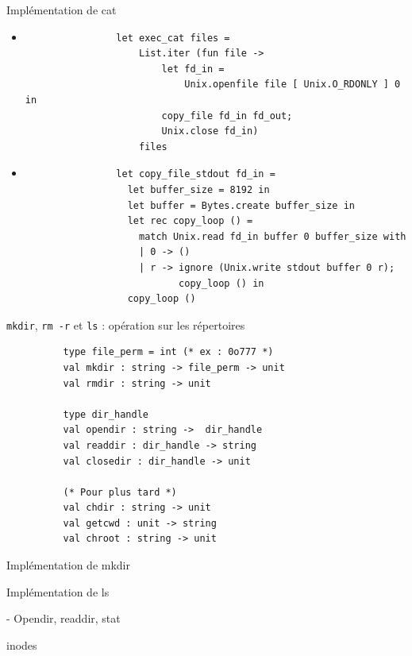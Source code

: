\begin{frame}[fragile]{Implémentation de cat}
    \begin{itemize}[leftmargin=-10pt]
        \item<1->
            \begin{lstlisting}
                let exec_cat files = 
                    List.iter (fun file ->
                        let fd_in = 
                            Unix.openfile file [ Unix.O_RDONLY ] 0 in
                        copy_file fd_in fd_out;
                        Unix.close fd_in)
                    files
        \end{lstlisting}
        \item<2->
            \begin{lstlisting}
                let copy_file_stdout fd_in =
                  let buffer_size = 8192 in
                  let buffer = Bytes.create buffer_size in
                  let rec copy_loop () =
                    match Unix.read fd_in buffer 0 buffer_size with
                    | 0 -> ()
                    | r -> ignore (Unix.write stdout buffer 0 r);
                           copy_loop () in
                  copy_loop ()
            \end{lstlisting}
     \end{itemize}
\end{frame}


\begin{frame}[fragile]{\texttt{mkdir}, \texttt{rm -r} et \texttt{ls} : opération sur les répertoires}
      \begin{lstlisting}
          type file_perm = int (* ex : 0o777 *)
          val mkdir : string -> file_perm -> unit
          val rmdir : string -> unit
          
          type dir_handle
          val opendir : string ->  dir_handle
          val readdir : dir_handle -> string 
          val closedir : dir_handle -> unit
          
          (* Pour plus tard *)
          val chdir : string -> unit 
          val getcwd : unit -> string
          val chroot : string -> unit
    \end{lstlisting}
\end{frame}

\begin{frame}{Implémentation de mkdir}
    
\end{frame}

\begin{frame}{Implémentation de ls}

- Opendir, readdir, stat

inodes
    
\end{frame}


